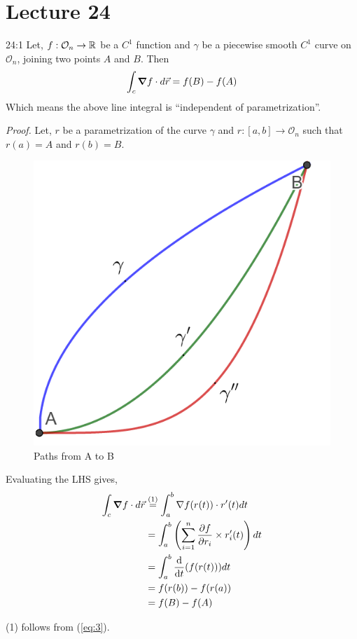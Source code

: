 \documentclass[../Analysis-3]{subfiles}
\begin{document}
\chapter*{Lecture 24} %
\setcounter{chapter}{24} %
\setcounter{section}{0}

\begin{Thm}{}{24:1}
    Let, $f: \mathcal{O}_n \to \mathbb{R}$ be a $C^1$ function and $\gamma$ be a piecewise smooth $C^1$ curve on $\mathcal{O}_n$, joining two points $A$ and $B$. Then
    \[\int_c \grad f\cdot d\vec{r} = f(B)-f(A)\]
    Which means the above line integral is ``independent of parametrization''.
\end{Thm}

\textit{Proof.} Let, $r$ be a parametrization of the curve $\gamma$ and $r :[a,b] \to \mathcal{O}_n$ such that $r(a)=A$ and $r(b)=B$.

\begin{figure}
    \centering
    \includegraphics[width=.78\linewidth]{../figures/lec-24.1.png}
    \caption{Paths from A to B}
\end{figure}

Evaluating the LHS gives,
\begin{align*}
    \int_c \grad f\cdot d\vec{r}
     & \overset{\mathrm{(1)}}{=} \int_a^b \nabla f(r(t)) \cdot r'(t) dt      \\
     & = \int_a^b \left(\sum_{i=1}^{n} \pdv{f}{r_i}\times r_i'(t) \right) dt \\
     & =\int_a^b \dv{t}(f(r(t))) dt                                          \\
     & = f(r(b)) - f(r(a))                                                   \\
     & = f(B) - f(A)
\end{align*}
\begin{center}
    (1) follows from (\ref{eq:3}).
\end{center}
\end{document}
